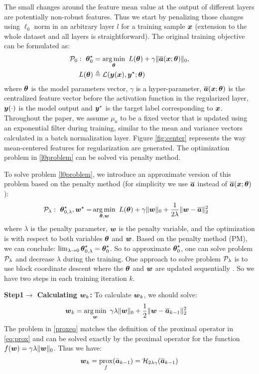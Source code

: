 \documentclass[conference]{IEEEtran}
\newcommand{\argmin}{\operatornamewithlimits{arg\,min}}
\begin{document}
The small changes around the feature mean value at the output of different layers are potentially non-robust features. Thus we start by penalizing those changes using $\ell_0$ norm in an arbitrary layer $l$ for a training sample $\boldsymbol{x}$ (extension to the whole dataset and all layers is straightforward). The original training objective can be formulated as:
\begin{align}
    \nonumber\Pc_0:~\thetab_0^\star &= \argmin_{\thetab}~L(\thetab)+\gamma\Vert\overline{\abn}(\xb;\thetab)\Vert_0,\\
    L(\thetab)&\triangleq \Lc(\yb(\xb),\yb^\star;\thetab)\label{l0problem}
\end{align}
where $\boldsymbol{\theta}$ is the model parameters vector, $\gamma$ is a hyper-parameter, $\overline{\boldsymbol{a}}(\boldsymbol{x};\boldsymbol{\theta})$ is the centralized feature vector before the activation function in the regularized layer, $\boldsymbol{y}(\cdot)$ is the model output and $\boldsymbol{y}^\star$ is the target label corresponding to $\boldsymbol{x}$.  Throughout the paper, we assume $\mu_a$ to be a fixed vector that is updated using an exponential filter during training, similar to the mean and variance vectors calculated in a batch normalization layer. Figure \ref{fig:center} represents the way mean-centered features for regularization are generated. The optimization problem in \eqref{l0problem} can be solved via penalty method.

To solve problem \eqref{l0problem}, we introduce an approximate version of this problem based on the penalty method (for simplicity we use $\overline{\boldsymbol{a}}$ instead of $\overline{\boldsymbol{a}}(\boldsymbol{x};\boldsymbol{\theta})$):
\begin{align}
\Pc_\lambda:~\thetab^\star_{0,\lambda},\wb^\star = &\argmin_{\thetab,\wb}~L(\thetab)+\gamma\Vert\wb\Vert_0+\frac{1}{2\lambda}\Vert \wb-\overline{\abn}\Vert_2^2\label{sigmamuproblem}
\end{align}
where $\lambda$ is the penalty parameter, $\boldsymbol{w}$ is the penalty variable,  and the optimization is with respect to both variables $\boldsymbol{\theta}$ and $\boldsymbol{w}$. Based on the penalty method (PM), we can conclude:
$\lim_{\lambda\rightarrow0}\boldsymbol{\theta}_{0,\lambda}^\star=\boldsymbol{\theta}^\star_0$. So to approximate $\boldsymbol{\theta}_0^\star$, one can solve problem $\mathcal{P}_\lambda$ and decrease $\lambda$ during the training. One approach to solve problem $\mathcal{P}_\lambda$ is to use block coordinate descent where the $\boldsymbol{\theta}$ and $\boldsymbol{w}$ are updated sequentially \cite{nonw99}. So we have two steps in each training iteration $k$.

\textbf{Step1$\rightarrow$ Calculating $\boldsymbol{w}_k$:}
To calculate $\boldsymbol{w}_k$, we should solve:
\begin{align}
    \wb_k &=\argmin_{\wb}~\gamma\lambda\Vert\wb\Vert_{0}+\frac{1}{2}\Vert \wb-\overline{\abn}_{k-1}\Vert_2^2\label{proxeq}
\end{align}
The problem in \eqref{proxeq} matches the definition of the proximal operator in \eqref{eq:prox}  and can be solved exactly by the proximal operator for the function $f(\boldsymbol{w})=\gamma\lambda\Vert \boldsymbol{w}\Vert_0$. Thus we have:
\begin{align}
    \boldsymbol{w}_k = \mathop{\mathrm{prox}}_{f}(\bar{\boldsymbol{a}}_{k-1}) = \mathcal{H}_{2\lambda\gamma}(\overline{\boldsymbol{a}}_{k-1})\label{stepw}
\end{align}
\end{document}
